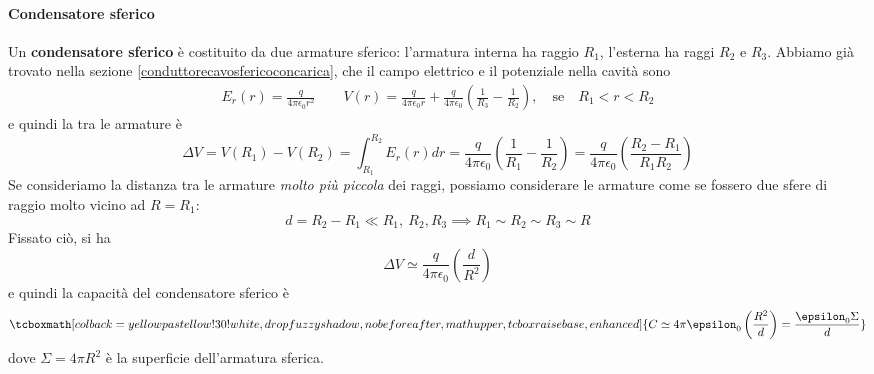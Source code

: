 \paragraph{Condensatore sferico}
Un \textbf{condensatore sferico} è costituito da due armature sferico: l'armatura interna ha raggio $R_1$, l'esterna ha raggi $R_2$ e $R_3$.
Abbiamo già trovato nella sezione \ref{conduttorecavosfericoconcarica}, \pageref{conduttorecavosfericoconcarica} che il campo elettrico e il potenziale nella cavità sono
\begin{align*}
	E_{r}(r)=\frac{q}{4\pi\epsilon_0r^2}\qquad
	V(r)=\frac{q}{4\pi\epsilon_0r}+\frac{q}{4\pi\epsilon_0}\left(\frac{1}{R_3}-\frac{1}{R_2}\right), \quad\text{se}\quad R_1<r<R_2
\end{align*}
e quindi la \ddp tra le armature è
\begin{equation*}
	\Delta V=V(R_1)-V(R_2)=\int_{R_1}^{R_2}E_r(r)dr=\frac{q}{4\pi\epsilon_0}\left(\frac{1}{R_1}-\frac{1}{R_2}\right)=\frac{q}{4\pi\epsilon_0}\left(\frac{R_2-R_1}{R_1R_2}\right)
\end{equation*}
Se consideriamo la distanza tra le armature \textit{molto più piccola} dei raggi, possiamo considerare le armature come se fossero due sfere di raggio molto vicino ad $R=R_1$:
\begin{equation*}
	d=R_2-R_1\ll R_1,\ R_2, R_3\implies R_1\sim R_2\sim R_3\sim R
\end{equation*}
Fissato ciò, si ha
\begin{equation*}
	\Delta V\simeq\frac{q}{4\pi\epsilon_0}\left(\frac{d}{R^2}\right)
\end{equation*}
e quindi la capacità del condensatore sferico è
\begin{equation}
	\tcboxmath[colback=yellowpastellow!30!white,drop fuzzy shadow, nobeforeafter, math upper, tcbox raise base, enhanced]{C\simeq 4\pi\epsilon_0\left(\frac{R^2}{d}\right)=\frac{\epsilon_0\Sigma}{d}}
\end{equation}
dove $\Sigma=4\pi R^2$ è la superficie dell'armatura sferica.
